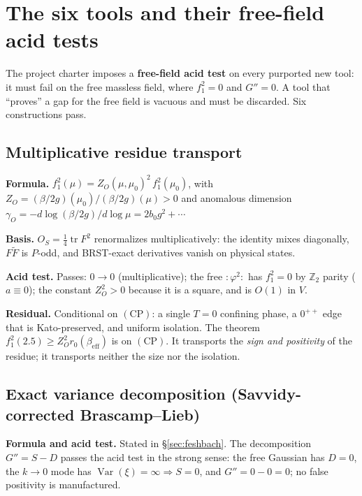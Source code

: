 \section{The six tools and their free-field acid tests}
\label{sec:tools}

The project charter imposes a \textbf{free-field acid test} on every purported new tool: it must
fail on the free massless field, where $f_1^2=0$ and $G''=0$. A tool that ``proves'' a gap for
the free field is vacuous and must be discarded. Six constructions pass.

\subsection{Multiplicative residue transport}

\textbf{Formula.}
$f_1^2(\mu)=Z_O(\mu,\mu_0)^2\,f_1^2(\mu_0)$, with
$Z_O=(\beta/2g)(\mu_0)/(\beta/2g)(\mu)>0$ and anomalous dimension
$\gamma_O=-d\log(\beta/2g)/d\log\mu=2b_0g^2+\cdots$

\textbf{Basis.} $O_S=\tfrac14\operatorname{tr}F^2$ renormalizes multiplicatively: the identity
mixes diagonally, $F\tilde F$ is $P$-odd, and BRST-exact derivatives vanish on physical states.

\textbf{Acid test.} Passes: $0\to0$ (multiplicative); the free ${:}\varphi^2{:}$ has $f_1^2=0$ by
$\mathbb{Z}_2$ parity ($a\equiv0$); the constant $Z_O^2>0$ because it is a square, and is $O(1)$
in $V$.

\textbf{Residual.} Conditional on $(\mathrm{CP})$: a single $T=0$ confining phase, a $0^{++}$
edge that is Kato-preserved, and uniform isolation. The theorem
$f_1^2(2.5)\ge Z_O^2r_0(\beta_{\mathrm{eff}})$ is \LC{} on $(\mathrm{CP})$. It transports the
\emph{sign and positivity} of the residue; it transports neither the size nor the isolation.

\subsection{Exact variance decomposition (Savvidy-corrected Brascamp--Lieb)}

\textbf{Formula and acid test.} Stated in \S\ref{sec:feshbach}. The decomposition $G''=S-D$
passes the acid test in the strong sense: the free Gaussian has $D=0$, the $k\to0$ mode has
$\operatorname{Var}(\xi)=\infty\Rightarrow S=0$, and $G''=0-0=0$; no false positivity is
manufactured.

